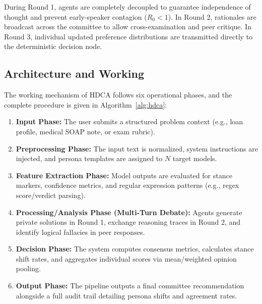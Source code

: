 \documentclass[a4paper,fleqn]{cas-sc}
\begin{document}
During Round 1, agents are completely decoupled to guarantee independence of thought and prevent early-speaker contagion ($R_0 < 1$). In Round 2, rationales are broadcast across the committee to allow cross-examination and peer critique. In Round 3, individual updated preference distributions are transmitted directly to the deterministic decision node.

\subsection{Architecture and Working}
The working mechanism of HDCA follows six operational phases, and the complete procedure is given in Algorithm~\ref{alg:hdca}:
\begin{enumerate}
    \item \textbf{Input Phase:} The user submits a structured problem context (e.g., loan profile, medical SOAP note, or exam rubric).
    \item \textbf{Preprocessing Phase:} The input text is normalized, system instructions are injected, and persona templates are assigned to $N$ target models.
    \item \textbf{Feature Extraction Phase:} Model outputs are evaluated for stance markers, confidence metrics, and regular expression patterns (e.g., regex score/verdict parsing).
    \item \textbf{Processing/Analysis Phase (Multi-Turn Debate):} Agents generate private solutions in Round 1, exchange reasoning traces in Round 2, and identify logical fallacies in peer responses.
    \item \textbf{Decision Phase:} The system computes consensus metrics, calculates stance shift rates, and aggregates individual scores via mean/weighted opinion pooling.
    \item \textbf{Output Phase:} The pipeline outputs a final committee recommendation alongside a full audit trail detailing persona shifts and agreement rates.
\end{enumerate}
\end{document}
